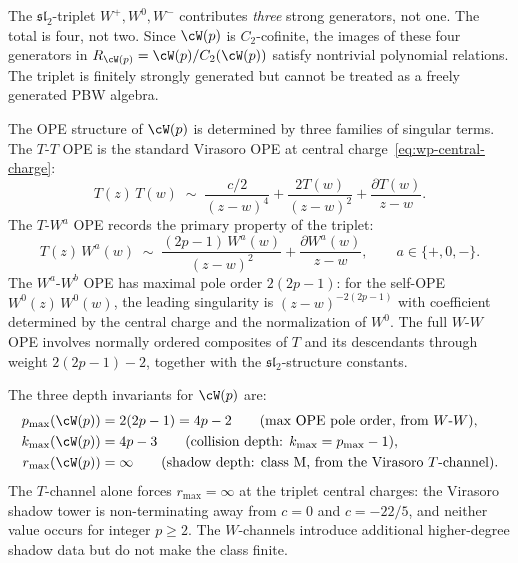 \begin{remark}
\label{rem:wp-generator-count}
The $\mathfrak{sl}_2$-triplet $W^+, W^0, W^-$ contributes
\emph{three} strong generators, not one. The total is four,
not two. Since $\cW(p)$ is $C_2$-cofinite, the images of these
four generators in $R_{\cW(p)}=\cW(p)/C_2(\cW(p))$ satisfy
nontrivial polynomial relations. The triplet is finitely strongly
generated but cannot be treated as a freely generated PBW algebra.
\end{remark}

The OPE structure of $\cW(p)$ is determined by three families
of singular terms. The $T$-$T$ OPE is the standard Virasoro OPE
at central charge~\eqref{eq:wp-central-charge}:
\begin{equation}\label{eq:wp-TT-ope}
 T(z)\,T(w) \;\sim\;
 \frac{c/2}{(z-w)^4} + \frac{2T(w)}{(z-w)^2}
 + \frac{\partial T(w)}{z-w}.
\end{equation}
The $T$-$W^a$ OPE records the primary property of the triplet:
\begin{equation}\label{eq:wp-TW-ope}
 T(z)\,W^a(w) \;\sim\;
 \frac{(2p{-}1)\,W^a(w)}{(z-w)^2}
 + \frac{\partial W^a(w)}{z-w},
 \qquad a \in \{+, 0, -\}.
\end{equation}
The $W^a$-$W^b$ OPE has maximal pole order $2(2p{-}1)$:
for the self-OPE $W^0(z)\,W^0(w)$, the leading singularity
is $(z-w)^{-2(2p-1)}$ with coefficient determined by the
central charge and the normalization of $W^0$. The full
$W$-$W$ OPE involves normally ordered composites of $T$
and its descendants through weight $2(2p{-}1) - 2$, together
with the $\mathfrak{sl}_2$-structure constants.

\begin{remark}
\label{rem:wp-pole-depth}
The three depth invariants for $\cW(p)$ are:
\begin{align}
 p_{\max}(\cW(p)) &= 2(2p-1) = 4p - 2
 \qquad\text{(max OPE pole order, from $W$-$W$)}, \\
 k_{\max}(\cW(p)) &= 4p - 3
 \qquad\text{(collision depth: $k_{\max} = p_{\max} - 1$)}, \\
 r_{\max}(\cW(p)) &= \infty
 \qquad\text{(shadow depth: class M, from the Virasoro $T$-channel)}.
\end{align}
The $T$-channel alone forces $r_{\max} = \infty$ at the triplet
central charges: the Virasoro shadow tower is non-terminating away
from $c=0$ and $c=-22/5$, and neither value occurs for integer
$p\ge2$. The $W$-channels introduce additional higher-degree shadow
data but do not make the class finite.
\end{remark}

